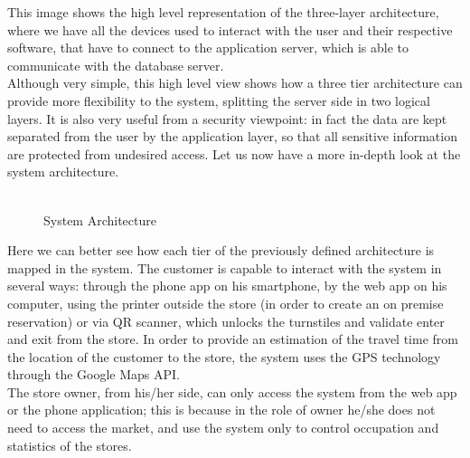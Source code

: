 This image shows the high level representation of the three-layer architecture, where we have all the devices used to interact with the user and their respective software, that have to connect to the application server, which is able to communicate with the database server.\\
Although very simple, this high level view shows how a three tier architecture can provide more flexibility to the system, splitting the server side in two logical layers. It is also very useful from a security viewpoint: in fact the data are kept separated from the user by the application layer, so that all sensitive information are protected from undesired access.
\newpage
Let us now have a more in-depth look at the system architecture.\\\\
\begin{figure}[H]
	\noindent
	\caption{System Architecture} 
\end{figure}
Here we can better see how each tier of the previously defined architecture is mapped in the system. The customer is capable to interact with the system in several ways: through the phone app on his smartphone, by the web app on his computer, using the printer outside the store (in order to create an on premise reservation) or via QR scanner, which unlocks the turnstiles and validate enter and exit from the store. In order to provide an estimation of the travel time from the location of the customer to the store, the system uses the GPS technology through the Google Maps API.\\
The store owner, from his/her side, can only access the system from the web app or the phone application; this is because in the role of owner he/she does not need to access the market, and use the system only to control occupation and statistics of the stores.\\
